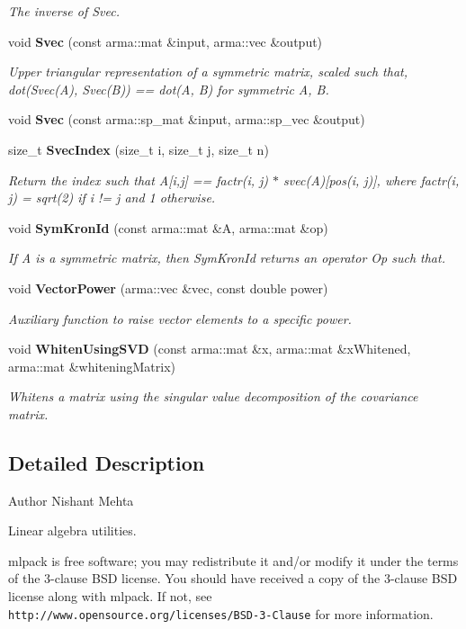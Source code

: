 \begin{DoxyCompactItemize}
\begin{DoxyCompactList}\small\item\em The inverse of Svec. \end{DoxyCompactList}\item 
void \textbf{ Svec} (const arma\+::mat \&input, arma\+::vec \&output)
\begin{DoxyCompactList}\small\item\em Upper triangular representation of a symmetric matrix, scaled such that, dot(Svec(\+A), Svec(\+B)) == dot(\+A, B) for symmetric A, B. \end{DoxyCompactList}\item 
void \textbf{ Svec} (const arma\+::sp\+\_\+mat \&input, arma\+::sp\+\_\+vec \&output)
\item 
size\+\_\+t \textbf{ Svec\+Index} (size\+\_\+t i, size\+\_\+t j, size\+\_\+t n)
\begin{DoxyCompactList}\small\item\em Return the index such that A[i,j] == factr(i, j) $\ast$ svec(\+A)[pos(i, j)], where factr(i, j) = sqrt(2) if i != j and 1 otherwise. \end{DoxyCompactList}\item 
void \textbf{ Sym\+Kron\+Id} (const arma\+::mat \&A, arma\+::mat \&op)
\begin{DoxyCompactList}\small\item\em If A is a symmetric matrix, then Sym\+Kron\+Id returns an operator Op such that. \end{DoxyCompactList}\item 
void \textbf{ Vector\+Power} (arma\+::vec \&vec, const double power)
\begin{DoxyCompactList}\small\item\em Auxiliary function to raise vector elements to a specific power. \end{DoxyCompactList}\item 
void \textbf{ Whiten\+Using\+S\+VD} (const arma\+::mat \&x, arma\+::mat \&x\+Whitened, arma\+::mat \&whitening\+Matrix)
\begin{DoxyCompactList}\small\item\em Whitens a matrix using the singular value decomposition of the covariance matrix. \end{DoxyCompactList}\end{DoxyCompactItemize}


\subsection{Detailed Description}
\begin{DoxyAuthor}{Author}
Nishant Mehta
\end{DoxyAuthor}
Linear algebra utilities.

mlpack is free software; you may redistribute it and/or modify it under the terms of the 3-\/clause B\+SD license. You should have received a copy of the 3-\/clause B\+SD license along with mlpack. If not, see {\tt http\+://www.\+opensource.\+org/licenses/\+B\+S\+D-\/3-\/\+Clause} for more information. 